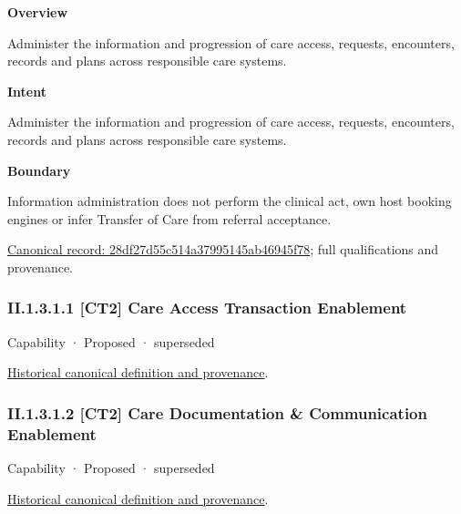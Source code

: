 \textbf{Overview}



Administer the information and progression of care access, requests, encounters, records and plans across responsible care systems.



\textbf{Intent}



Administer the information and progression of care access, requests, encounters, records and plans across responsible care systems.



\textbf{Boundary}



Information administration does not perform the clinical act, own host booking engines or infer Transfer of Care from referral acceptance.


{\footnotesize \href{../../../../continuum/strategy/capability/28df27d55c514a37995145ab46945f78.md}{Canonical record: 28df27d55c514a37995145ab46945f78}; full qualifications and provenance.}\par
\subsubsection*{II.1.3.1.1 [CT2] Care Access Transaction Enablement}
\label{navigation:II.1.3.1.1}

\label{element:b65973b576154d3a96cf458bf33df53a}
{\small Capability · Proposed · superseded}\par
\href{../../../../continuum/strategy/capability/b65973b576154d3a96cf458bf33df53a.md}{Historical canonical definition and provenance}.\par
\subsubsection*{II.1.3.1.2 [CT2] Care Documentation \& Communication Enablement}
\label{navigation:II.1.3.1.2}

\label{element:5ad2e381ec484d1d9062a65eee842fa7}
{\small Capability · Proposed · superseded}\par
\href{../../../../continuum/strategy/capability/5ad2e381ec484d1d9062a65eee842fa7.md}{Historical canonical definition and provenance}.\par

